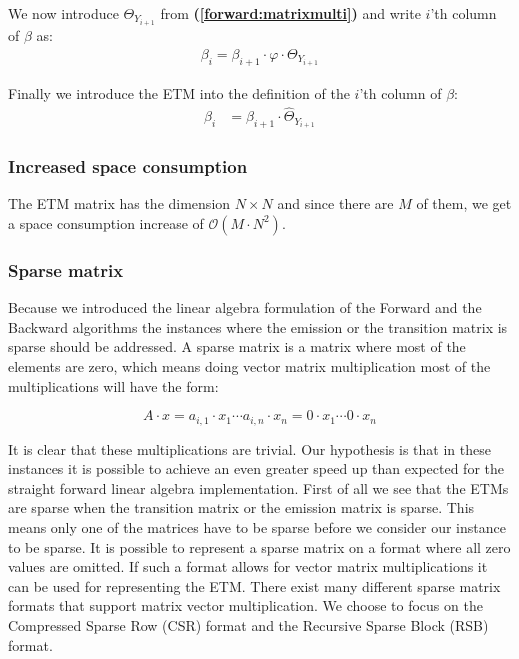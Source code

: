 We now introduce $\Theta_{Y_{i+1}}$ from \textbf{(\ref{forward:matrixmulti})} and write $i$'th column of $\beta$ as:
\begin{align*}
  \beta_i = \beta_{i+1}\cdot\varphi\cdot\Theta_{Y_{i+1}}
\end{align*}

Finally we introduce the ETM into the definition of the $i$'th column of $\beta$:
\begin{align}\label{beta:one}
  \beta_{i} &= \beta_{i+1}\cdot\hat{\Theta}_{Y_{i+1}}
\end{align}
        
\subsubsection{Increased space consumption}

The ETM matrix has the dimension $N \times N$ and since there are $ M $ of them, we get a space consumption increase of $\mathcal{O}(M \cdot N^2)$.

\subsubsection{Sparse matrix}

Because we introduced the linear algebra formulation of the Forward and the Backward algorithms the instances where the emission or the transition matrix is sparse should be addressed. A sparse matrix is a matrix where most of the elements are zero, which means doing vector matrix multiplication most of the multiplications will have the form: 

$$A\cdot x = a_{i,1}\cdot x_1\cdots a_{i,n}\cdot x_n = 0\cdot x_1\cdots0\cdot x_n$$

It is clear that these multiplications are trivial. Our hypothesis is that in these instances it is possible to achieve an even greater speed up than expected for the straight forward linear algebra implementation. 
First of all we see that the ETMs are sparse when the transition matrix or the emission matrix is sparse. This means only one of the matrices have to be sparse before we consider our instance to be sparse. It is possible to represent a sparse matrix on a format where all zero values are omitted. If such a format allows for vector matrix multiplications it can be used for representing the ETM. There exist many different sparse matrix formats that support matrix vector multiplication. We choose to focus on the Compressed Sparse Row (CSR) format and the Recursive Sparse Block (RSB) format. 


